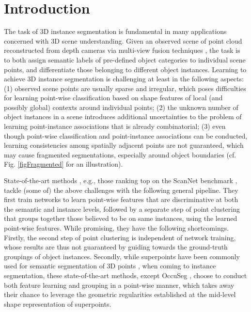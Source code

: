 \documentclass[10pt,twocolumn,letterpaper]{article}
\begin{document}
\vspace{-0.5cm}

\section{Introduction}
\label{SecIntro}

The task of 3D instance segmentation is fundamental in many applications concerned with 3D scene understanding. Given an observed scene of point cloud reconstructed from depth cameras
via multi-view fusion techniques \cite{dai2017bundlefusion, Han2018FlashFusionRG}, the task is to both assign semantic labels of pre-defined object categories to individual scene points, and differentiate those belonging to different object instances. Learning to achieve 3D instance segmentation is challenging at least in the following aspects: (1) observed scene points are usually sparse and irregular, which poses difficulties for learning point-wise classification based on shape features of local (and possibly global) contexts around individual points; (2) the unknown number of object instances in a scene introduces additional uncertainties to the problem of learning point-instance associations that is already combinatorial; (3) even though point-wise classification and point-instance associations can be conducted, learning consistencies among spatially adjacent points are not guaranteed, which may cause fragmented segmentations, especially around object boundaries (cf. Fig. \ref{figFragmented} for an illustration).

State-of-the-art methods \cite{jiang2020pointgroup,zhang2019point,engelmann20203d}, e.g., those ranking top on the ScanNet benchmark \cite{dai2017scannet}, tackle (some of) the above challenges with the following general pipeline. They first train networks to learn point-wise features that are discriminative at both the semantic and instance levels, followed by a separate step of point clustering that groups together those believed to be on same instances, using the learned point-wise features. While promising, they have the following shortcomings. Firstly, the second step of point clustering is independent of network training, whose results are thus not guaranteed by guiding towards the ground-truth groupings of object instances. Secondly, while superpoints \cite{landrieu2018large} have been commonly used for semantic segmentation of 3D points \cite{landrieu2019point, cheng2020cascaded}, when coming to instance segmentation, these state-of-the-art methods, except OccuSeg \cite{han2020occuseg}, choose to conduct both feature learning and grouping in a point-wise manner, which takes away their chance to leverage the geometric regularities established at the mid-level shape representation of superpoints.  
\end{document}
